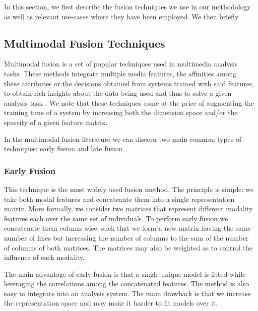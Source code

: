 \documentclass{llncs}
\begin{document}
In this section, we first describe the fusion techniques we use in our methodology as well as relevant use-cases where they have been employed. We then briefly                                                
\subsection{Multimodal Fusion Techniques}
Multimodal fusion is a set of popular techniques used in multimedia analysis tasks. These methods integrate multiple media features, the affinities among these attributes or the decisions obtained from systems trained with said features, to obtain rich insights about the data being used and thus to solve a given analysis  task \cite{Ah-PineCC15,AtreyHEK10}. We note that these techniques come at the price of augmenting the training time of a system by increasing both the dimension space and/or the sparsity of a given feature matrix.


In the multimodal fusion literature we can discern two main common types of techniques: early fusion and late fusion. 
\subsubsection{Early Fusion}
This technique is the most widely used fusion method. The principle is simple: we take both modal features and concatenate them into a single representation matrix. More formally, we consider two matrices  that represent different modality features each  over the same set of individuals. To perform early fusion we concatenate them column-wise, such that we form a new matrix having the same number of lines but increasing the number of columns to the sum of the number of columns of both matrices. The matrices may also be weighted as to control the influence of each modality.

The main advantage of early fusion is that a single unique model is fitted while leveraging the correlations among the concatenated features. The method is also easy to integrate into an analysis system. The main drawback is that we increase the representation space and may make it harder to fit models over it.
%

\end{document}

